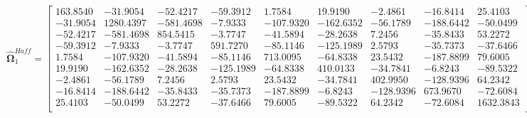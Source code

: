 \documentclass{article}\usepackage[]{graphicx}\usepackage[]{xcolor}
\def\bs{\boldsymbol}
\begin{document}
 \[
 \widehat{\bs{\Omega}}_{1}^{Haff} = 
 
  \begin{bmatrix}
 
 
 
 163.8540 & -31.9054 & -52.4217 & -59.3912 & 1.7584 & 19.9190 & -2.4861 & -16.8414 & 25.4103\\
 
 -31.9054 & 1280.4397 & -581.4698 & -7.9333 & -107.9320 & -162.6352 & -56.1789 & -188.6442 & -50.0499\\
 
 -52.4217 & -581.4698 & 854.5415 & -3.7747 & -41.5894 & -28.2638 & 7.2456 & -35.8433 & 53.2272\\
 
 -59.3912 & -7.9333 & -3.7747 & 591.7270 & -85.1146 & -125.1989 & 2.5793 & -35.7373 & -37.6466\\
 
 1.7584 & -107.9320 & -41.5894 & -85.1146 & 713.0095 & -64.8338 & 23.5432 & -187.8899 & 79.6005\\
 
 19.9190 & -162.6352 & -28.2638 & -125.1989 & -64.8338 & 410.0133 & -34.7841 & -6.8243 & -89.5322\\
 
 -2.4861 & -56.1789 & 7.2456 & 2.5793 & 23.5432 & -34.7841 & 402.9950 & -128.9396 & 64.2342\\
 
 -16.8414 & -188.6442 & -35.8433 & -35.7373 & -187.8899 & -6.8243 & -128.9396 & 673.9670 & -72.6084\\
 
 25.4103 & -50.0499 & 53.2272 & -37.6466 & 79.6005 & -89.5322 & 64.2342 & -72.6084 & 1632.3843\\
 
 
 \end{bmatrix}
 \]
 
\end{document}
